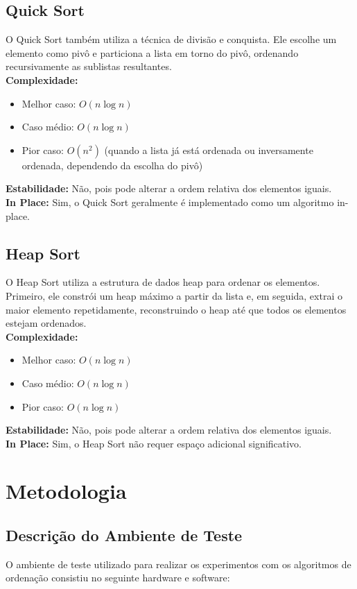 \documentclass[tcc1,project]{uftex}
\begin{document}
\section{Quick Sort}
O Quick Sort também utiliza a técnica de divisão e conquista. Ele escolhe um elemento como pivô e particiona a lista em torno do pivô, ordenando recursivamente as sublistas resultantes. \\
\textbf{Complexidade:}
\begin{itemize}
    \item Melhor caso: $O(n \log n)$
    \item Caso médio: $O(n \log n)$
    \item Pior caso: $O(n^2)$ (quando a lista já está ordenada ou inversamente ordenada, dependendo da escolha do pivô)
    
\end{itemize}
\textbf{Estabilidade:} Não, pois pode alterar a ordem relativa dos elementos iguais. \\
\textbf{In Place:} Sim, o Quick Sort geralmente é implementado como um algoritmo in-place. \\

\section{Heap Sort}
O Heap Sort utiliza a estrutura de dados heap para ordenar os elementos. Primeiro, ele constrói um heap máximo a partir da lista e, em seguida, extrai o maior elemento repetidamente, reconstruindo o heap até que todos os elementos estejam ordenados. \\
\textbf{Complexidade:}
\begin{itemize}
    \item Melhor caso: $O(n \log n)$
    \item Caso médio: $O(n \log n)$
    \item Pior caso: $O(n \log n)$
    
    
\end{itemize}
\textbf{Estabilidade:} Não, pois pode alterar a ordem relativa dos elementos iguais. \\
\textbf{In Place:} Sim, o Heap Sort não requer espaço adicional significativo. \\
\chapter{Metodologia}

\section{Descrição do Ambiente de Teste}
O ambiente de teste utilizado para realizar os experimentos com os algoritmos de ordenação consistiu no seguinte hardware e software:
\end{document}
